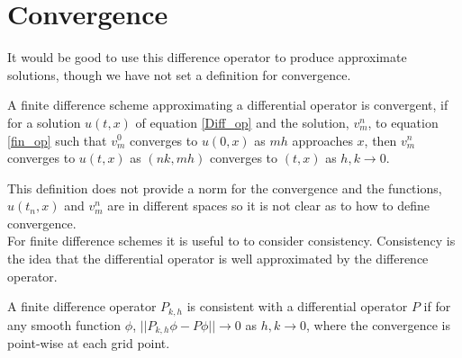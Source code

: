 \section{Convergence}
It would be good to use this difference operator to produce approximate solutions, though we have not set a definition for convergence.
\begin{definition}
A finite difference scheme approximating a differential operator is convergent, if for a solution $u(t,x)$ of equation \ref{Diff_op} and the solution, $v_m^n$, to equation \ref{fin_op} such that $v_m^0$ converges to $u(0,x)$ as $mh$ approaches $x$, then $v_m^n$ converges to $u(t,x)$ as $(nk,mh)$ converges to $(t,x)$ as $h,k \rightarrow 0$.
\end{definition} 
This definition does not provide a norm for the convergence and the functions, $u(t_n,x)$ and $v_m^n$ are in different spaces so it is not clear as to how to define convergence.\\
For finite difference schemes it is useful to to consider consistency. Consistency is the idea that the differential operator is well approximated by the difference operator.
\begin{definition}
A finite difference operator $P_{k,h}$ is consistent with a differential operator $P$ if for any smooth function $\phi$, $\lvert\lvert P_{k,h}\phi-P\phi\rvert\rvert \rightarrow 0$ as $h,k\rightarrow 0$,
where the convergence is point-wise at each grid point.
\end{definition} 
